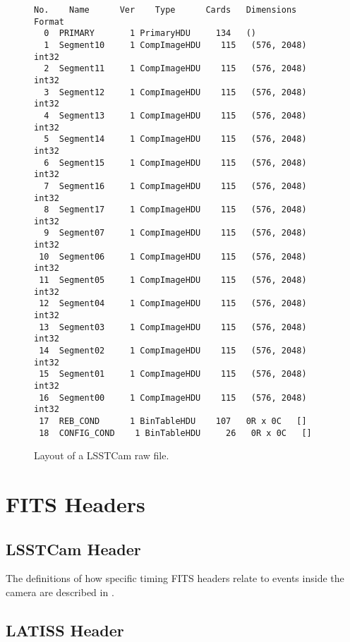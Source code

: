 \documentclass[OPS,lsstdraft,authoryear,toc]{lsstdoc}
\begin{document}
\begin{figure}
  \begin{center}
\begin{verbatim}
No.    Name      Ver    Type      Cards   Dimensions   Format
  0  PRIMARY       1 PrimaryHDU     134   ()
  1  Segment10     1 CompImageHDU    115   (576, 2048)   int32
  2  Segment11     1 CompImageHDU    115   (576, 2048)   int32
  3  Segment12     1 CompImageHDU    115   (576, 2048)   int32
  4  Segment13     1 CompImageHDU    115   (576, 2048)   int32
  5  Segment14     1 CompImageHDU    115   (576, 2048)   int32
  6  Segment15     1 CompImageHDU    115   (576, 2048)   int32
  7  Segment16     1 CompImageHDU    115   (576, 2048)   int32
  8  Segment17     1 CompImageHDU    115   (576, 2048)   int32
  9  Segment07     1 CompImageHDU    115   (576, 2048)   int32
 10  Segment06     1 CompImageHDU    115   (576, 2048)   int32
 11  Segment05     1 CompImageHDU    115   (576, 2048)   int32
 12  Segment04     1 CompImageHDU    115   (576, 2048)   int32
 13  Segment03     1 CompImageHDU    115   (576, 2048)   int32
 14  Segment02     1 CompImageHDU    115   (576, 2048)   int32
 15  Segment01     1 CompImageHDU    115   (576, 2048)   int32
 16  Segment00     1 CompImageHDU    115   (576, 2048)   int32
 17  REB_COND      1 BinTableHDU    107   0R x 0C   []
 18  CONFIG_COND    1 BinTableHDU     26   0R x 0C   []
\end{verbatim}
\end{center}
\caption{Layout of a LSSTCam raw file.}
\label{fig:layout}
\end{figure}

\section{FITS Headers}

\subsection{LSSTCam Header}

The definitions of how specific timing FITS headers relate to events inside the camera are described in .



\subsection{LATISS Header}


\end{document}
